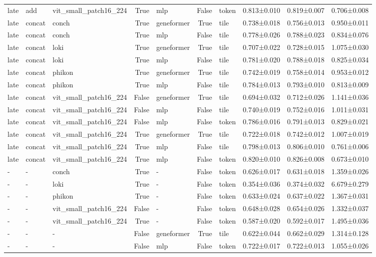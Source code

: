 \begin{table}
\begin{tabular}{lllrlrllll}
late & add & vit\_small\_patch16\_224 & True & mlp & False & token & 0.813±0.010 & 0.819±0.007 & 0.706±0.008 \\
late & concat & conch & True & geneformer & True & tile & 0.738±0.018 & 0.756±0.013 & 0.950±0.011 \\
late & concat & conch & True & mlp & False & tile & 0.778±0.026 & 0.788±0.023 & 0.834±0.076 \\
late & concat & loki & True & geneformer & True & tile & 0.707±0.022 & 0.728±0.015 & 1.075±0.030 \\
late & concat & loki & True & mlp & False & tile & 0.781±0.020 & 0.788±0.018 & 0.825±0.034 \\
late & concat & phikon & True & geneformer & True & tile & 0.742±0.019 & 0.758±0.014 & 0.953±0.012 \\
late & concat & phikon & True & mlp & False & tile & 0.784±0.013 & 0.793±0.010 & 0.813±0.009 \\
late & concat & vit\_small\_patch16\_224 & False & geneformer & True & tile & 0.694±0.032 & 0.712±0.026 & 1.141±0.036 \\
late & concat & vit\_small\_patch16\_224 & False & mlp & False & tile & 0.740±0.019 & 0.752±0.016 & 1.011±0.031 \\
late & concat & vit\_small\_patch16\_224 & False & mlp & False & token & 0.786±0.016 & 0.791±0.013 & 0.829±0.021 \\
late & concat & vit\_small\_patch16\_224 & True & geneformer & True & tile & 0.722±0.018 & 0.742±0.012 & 1.007±0.019 \\
late & concat & vit\_small\_patch16\_224 & True & mlp & False & tile & 0.798±0.013 & 0.806±0.010 & 0.761±0.006 \\
late & concat & vit\_small\_patch16\_224 & True & mlp & False & token & 0.820±0.010 & 0.826±0.008 & 0.673±0.010 \\
- & - & conch & True & - & False & token & 0.626±0.017 & 0.631±0.018 & 1.359±0.026 \\
- & - & loki & True & - & False & token & 0.354±0.036 & 0.374±0.032 & 6.679±0.279 \\
- & - & phikon & True & - & False & token & 0.633±0.024 & 0.637±0.022 & 1.367±0.031 \\
- & - & vit\_small\_patch16\_224 & False & - & False & token & 0.648±0.028 & 0.654±0.026 & 1.332±0.037 \\
- & - & vit\_small\_patch16\_224 & True & - & False & token & 0.587±0.020 & 0.592±0.017 & 1.495±0.036 \\
- & - & - & False & geneformer & True & tile & 0.622±0.044 & 0.662±0.029 & 1.314±0.128 \\
- & - & - & False & mlp & False & token & 0.722±0.017 & 0.722±0.013 & 1.055±0.026 \\
\bottomrule
\end{tabular}
\end{table}
